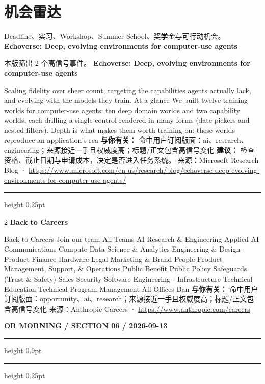 \documentclass[10.5pt]{ctexart}
\begin{document}
\section*{机会雷达}
{\color{ormuted} Deadline、实习、Workshop、Summer School、奖学金与可行动机会。}
\vspace{2mm}
{\LARGE\bfseries Echoverse: Deep, evolving environments for computer-use agents}\par
\vspace{1mm}
{\color{ormuted} 本版筛出 2 个高信号事件。}
\vspace{3mm}
{\Large\bfseries Echoverse: Deep, evolving environments for computer-use agents}\par
Scaling fidelity over sheer count, targeting the capabilities agents actually lack, and evolving with the models they train. At a glance We built twelve training worlds for computer-use agents: ten deep domain worlds and two capability worlds, each drilling a single control rendered in many forms (date pickers and nested filters). Depth is what makes them worth training on: these worlds reproduce an application’s rea
\textbf{与你有关：} 命中用户订阅版面：ai、research、engineering；来源接近一手且权威度高；标题/正文包含高信号变化
\textbf{建议：} 检查资格、截止日期与申请成本，决定是否进入任务系统。
{\footnotesize\color{ormuted} 来源：Microsoft Research Blog · \url{https://www.microsoft.com/en-us/research/blog/echoverse-deep-evolving-environments-for-computer-use-agents/}}
\vspace{4mm}
\hrule height 0.25pt
\vspace{3mm}
\begin{multicols}{2}
{\large\bfseries Back to Careers}\par
Back to Careers Join our team All Teams AI Research \& Engineering Applied AI Communications Compute Data Science \& Analytics Engineering \& Design - Product Finance Hardware Legal Marketing \& Brand People Product Management, Support, \& Operations Public Benefit Public Policy Safeguards (Trust \& Safety) Sales Security Software Engineering - Infrastructure Technical Education Technical Program Management All Offices Ban
\textbf{与你有关：} 命中用户订阅版面：opportunity、ai、research；来源接近一手且权威度高；标题/正文包含高信号变化
{\footnotesize\color{ormuted} 来源：Anthropic Careers · \url{https://www.anthropic.com/careers}}
\end{multicols}
\newpage
{\small\bfseries OR MORNING / SECTION 06 / 2026-09-13}
\vspace{2mm}
\hrule height 0.9pt
\vspace{1.5mm}
\hrule height 0.25pt
\vspace{4mm}
\end{document}
